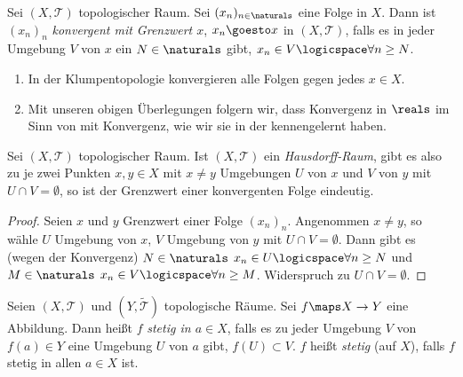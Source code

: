 \begin{definition} \label{konvergenz_in_topologischen_raeumen}
    Sei \( (X, \mathcal{T}) \) topologischer Raum.
    Sei \( (x_n)_{n\in \naturals} \) eine Folge in \( X \).
    Dann ist \( (x_n)_{n} \) \emph{konvergent mit Grenzwert \( x \)}, \( x_n\goesto x \) in \( (X, \mathcal{T}) \), falls es in jeder Umgebung \( V \) von \( x  \) ein \( N\in \naturals \) gibt, \sd \( x_n\in V\logicspace\forall n\geq N \).
    
\end{definition}

\begin{beispiele*}
    \begin{enumerate}
        \item In der Klumpentopologie konvergieren alle Folgen gegen jedes \( x\in X \).
        \item Mit unseren obigen Überlegungen folgern wir, dass Konvergenz in \( \reals \) im Sinn von  mit Konvergenz, wie wir sie in der  kennengelernt haben.
    \end{enumerate}
\end{beispiele*}
\begin{lemma}\label{hausdorff_alle_grenzwerte_eindeutig}
    Sei \( (X,\mathcal{T}) \) topologischer Raum. 
    Ist \( (X, \mathcal{T}) \) ein \emph{Hausdorff-Raum}, gibt es also zu je zwei Punkten \( x,y\in X \) mit \( x\neq y \) Umgebungen \( U \) von \( x \) und \( V \) von \( y \) mit \( U \cap V=\emptyset \), so ist der Grenzwert einer konvergenten Folge eindeutig.
\end{lemma}
\begin{proof}
    Seien \( x \) und \( y \) Grenzwert einer Folge \( (x_n)_n \).
    Angenommen \( x\neq y \), so wähle \( U \) Umgebung von \( x \), \( V \) Umgebung von \( y \) mit \( U\cap V=\emptyset \). 
    Dann gibt es (wegen der Konvergenz) \( N \in \naturals \) \sd \( x_n \in U \logicspace\forall n \geq N \) und \( M\in \naturals \) \sd \( x_n \in V \logicspace \forall n \geq M \). 
    Widerspruch zu \( U\cap V = \emptyset \). 
\end{proof}
\begin{definition}\label{stetigkeit_in_topologischen_raeumen}
    Seien \( (X, \mathcal{T}) \) und \( (Y,\tilde{\mathcal{T}}) \) topologische Räume. 
    Sei \( f\maps X\to Y \) eine Abbildung. 
    Dann heißt \( f \) \emph{stetig in \( a\in X \)}, falls es zu jeder Umgebung \( V \) von \( f(a)\in Y \) eine Umgebung \( U \) von \( a \) gibt, \sd \( f(U)\subset V \). 
    \( f \) heißt \emph{stetig} (auf \( X \)), falls \( f \) stetig in allen \( a\in X \) ist.
\end{definition}
